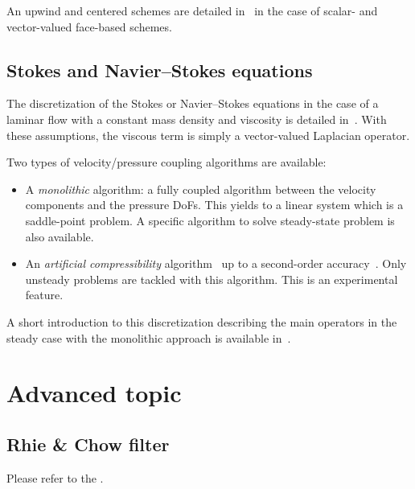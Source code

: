 An upwind and centered schemes are detailed in~\cite{Mila20} in the case of
scalar- and vector-valued face-based schemes.

\subsection{Stokes and Navier--Stokes equations}

The discretization of the Stokes or Navier--Stokes equations in the case of a
laminar flow with a constant mass density and viscosity is detailed
in~\cite{Mila20}. With these assumptions, the viscous term is simply a
vector-valued Laplacian operator.

Two types of velocity/pressure coupling algorithms are available:
\begin{itemize}
\item A \emph{monolithic} algorithm: a fully coupled algorithm between the
  velocity components and the pressure DoFs. This yields to a linear system
  which is a saddle-point problem. A specific algorithm to solve steady-state
  problem is also available.
\item An \emph{artificial compressibility} algorithm~\cite{GuMi15} up to a
  second-order accuracy~\cite{MiBoE22}. Only unsteady problems are tackled with this
  algorithm. This is an experimental feature.
\end{itemize}

A short introduction to this discretization describing the main operators in
the steady case with the monolithic approach is available in~\cite{BoErM20}.

\section{Advanced topic}

\subsection{Rhie \& Chow filter}

\hypertarget{arak}{}

Please refer to the .

